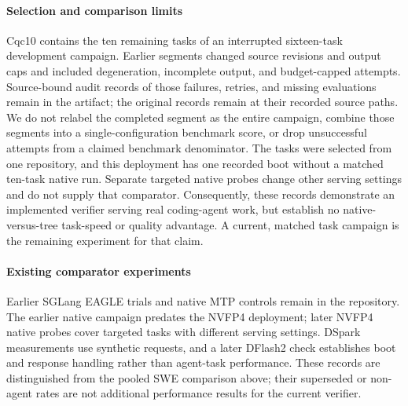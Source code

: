 \paragraph{Selection and comparison limits}
Cqc10 contains the ten remaining tasks of an interrupted sixteen-task development campaign. Earlier segments changed source revisions and output caps and included degeneration, incomplete output, and budget-capped attempts. Source-bound audit records of those failures, retries, and missing evaluations remain in the artifact; the original records remain at their recorded source paths. We do not relabel the completed segment as the entire campaign, combine those segments into a single-configuration benchmark score, or drop unsuccessful attempts from a claimed benchmark denominator. The tasks were selected from one repository, and this deployment has one recorded boot without a matched ten-task native run. Separate targeted native probes change other serving settings and do not supply that comparator. Consequently, these records demonstrate an implemented verifier serving real coding-agent work, but establish no native-versus-tree task-speed or quality advantage. A current, matched task campaign is the remaining experiment for that claim.


\paragraph{Existing comparator experiments}
Earlier SGLang EAGLE trials and native MTP controls remain in the repository. The earlier native campaign predates the NVFP4 deployment; later NVFP4 native probes cover targeted tasks with different serving settings. DSpark measurements use synthetic requests, and a later DFlash2 check establishes boot and response handling rather than agent-task performance. These records are distinguished from the pooled SWE comparison above; their superseded or non-agent rates are not additional performance results for the current verifier.
